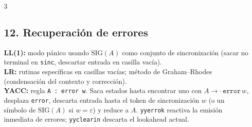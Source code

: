 \begin{landscape}
\begin{multicols*}{3}
\subsection*{12. Recuperación de errores}
\textbf{LL(1):} modo pánico usando $\mathrm{SIG}(A)$ como conjunto de sincronización (sacar no terminal en \texttt{sinc}, descartar entrada en casilla vacía).\\
\textbf{LR:} rutinas específicas en casillas vacías; método de Graham--Rhodes (condensación del contexto y corrección).\\
\textbf{YACC:} regla \texttt{A : error w}. Saca estados hasta encontrar uno con $A\to\mathbin{\boldsymbol{\cdot}}\,\texttt{error}\,w$, desplaza \texttt{error}, descarta entrada hasta el token de sincronización $w$ (o un símbolo de $\mathrm{SIG}(A)$ si $w=\varepsilon$) y reduce a $A$. \texttt{yyerrok} reactiva la emisión inmediata de errores; \texttt{yyclearin} descarta el lookahead actual.

\end{multicols*}
\endgroup
\end{landscape}
\restoregeometry
